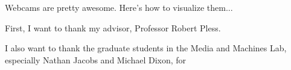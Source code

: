 %

\begin{thesistitlepage}               %
\end{thesistitlepage}

\begin{thesisabstract}
Webcams are pretty awesome.  Here's how to visualize them...
\end{thesisabstract}

\begin{thesisacknowledgments}

First, I want to thank my advisor, Professor Robert Pless.

I also want to thank the graduate students in the Media and Machines Lab, especially Nathan Jacobs and Michael Dixon, for

\end{thesisacknowledgments}


\begin{singlespace}
\tableofcontents



\listoffigures
\end{singlespace}

